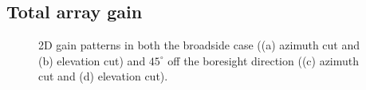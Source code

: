 \documentclass[10 pt,a4paper,twocolumn]{article}
\begin{document}
{\begin{table}[bt!]
\begin{center}
		\label{table:EH fields}
	\end{center}
\end{table} 



\subsection*{Total array gain}

\begin{figure}[bt!]

	\begin{subfigure}{0.24\linewidth}
		\def\svgwidth{\linewidth}
		\fontsize{4}{4}\selectfont{}
		\caption{}
	\end{subfigure}	\hfill
	\begin{subfigure}{0.24\linewidth}
		\def\svgwidth{\linewidth}
	\fontsize{4}{4}\selectfont{}
		\caption{}
	\end{subfigure}	\hfill
	\begin{subfigure}{0.24\linewidth}
		\def\svgwidth{\linewidth}
	\fontsize{4}{4}\selectfont{}
		\caption{}
	\end{subfigure}
	\hfill
	\begin{subfigure}{0.24\linewidth}
		\def\svgwidth{\linewidth}
	\fontsize{4}{4}\selectfont{}
		\caption{}
	\end{subfigure}\hfill
	\caption{2D gain patterns in both the broadside case ((a) azimuth cut and (b) elevation cut) and $45^\circ$ off the boresight direction ((c) azimuth cut and (d) elevation cut).}
	\label{fig:array gain}
\end{figure}


}
\end{document}
